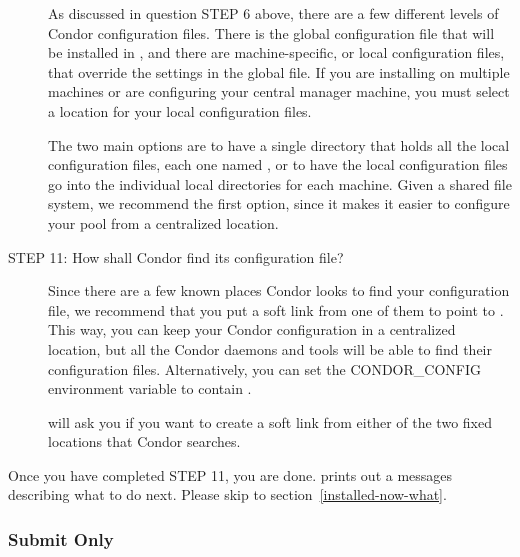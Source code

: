 \begin{description}
     As discussed in question STEP 6 above, there are a few different
     levels of Condor configuration files.  There is the
     global configuration file
     that will be installed in , and
     there are machine-specific, or local configuration files,
     that override
     the settings in the global file.  If you are installing on
     multiple machines or are configuring your central manager
     machine, you must select a location for your local 
     configuration files. 

     The two main options are to have a single directory that holds
     all the local configuration files, each one 
     named ,
     or to have the local configuration files go into the individual local
     directories for each machine.  Given a shared file system, we
     recommend the first option, since it makes it easier to configure
     your pool from a centralized location.


\item[STEP 11: How shall Condor find its configuration file?]

     Since there are a few known places Condor looks to find your
     configuration file, we recommend that you put a soft link from one of
     them to point to .  This way, you
     can keep your Condor configuration in a centralized location, but
     all the Condor daemons and tools will be able to find their
     configuration files.  Alternatively, you can set the CONDOR\_CONFIG
     environment variable to contain .

      will ask you if you want to create a soft link
     from either of the two fixed locations that Condor searches.

\end{description}

Once you have completed STEP 11, you are done.   prints
out a messages describing what to do next.  Please skip to 
section~\ref{installed-now-what}.

\subsubsection{\label{Install-Submit-Only}
Submit Only}

